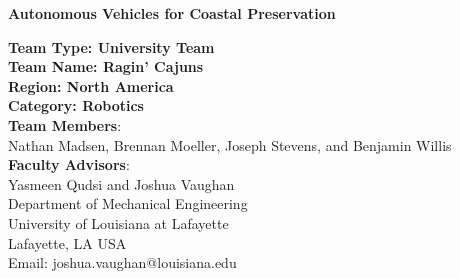 \documentclass[12 pt]{article}
\begin{document}
\begin{center}
{\LARGE \bf Autonomous Vehicles for Coastal Preservation}

\textbf{Team Type: University Team}\\
\textbf{Team Name: Ragin' Cajuns}\\
\textbf{Region: North America}\\
\textbf{Category: Robotics}\\
\textbf{Team Members}:\\Nathan Madsen, Brennan Moeller, Joseph Stevens, and Benjamin Willis\\
\vspace{0.1in}
\textbf{Faculty Advisors}:\\Yasmeen Qudsi and Joshua Vaughan \\

\vspace{0.1in}
\footnotesize{Department of Mechanical Engineering\\
University of Louisiana at Lafayette\\
Lafayette, LA USA\\
Email: joshua.vaughan@louisiana.edu}
\end{center}



\pagestyle{plain}
\cfoot{\thepage}

\begin{abstract}
\vspace{-0.2in}
The work proposed here seeks to improve the safety and efficiency of autonomous surface vessels used to monitor wetlands through the addition of an OAK-D camera. The OAK-D would increase the efficiency of the autonomous system by reducing the computational load on the on-board computers, thereby increasing the computational power available for both the scientific mission on the boat and the addition of more peripherals to enhance the safety. This addition would also help improve the localization precision the surface vessel by enabling more sensors, such as LiDAR, to be added with the same computational resources and power requirements. The overall system would be able to achieve safer and more efficient coastal monitoring with the addition of an OAK-D camera. 
\end{abstract}
\end{document}
